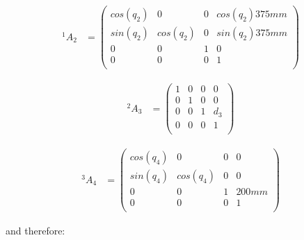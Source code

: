 \begin{align*}
^1A_2 &= 
\begin{pmatrix}
cos(q_2) & 0 & 0 & cos(q_2)375mm \\
sin(q_2) & cos(q_2) & 0 & sin(q_2)375mm \\
0 & 0 & 1 & 0 \\
0 & 0 & 0 & 1 \\
\end{pmatrix}
\end{align*}

\begin{align*}
^2A_3 &= 
\begin{pmatrix}
1 & 0 & 0 & 0 \\
0 & 1 & 0 & 0 \\
0 & 0 & 1 & d_3 \\
0 & 0 & 0 & 1 \\
\end{pmatrix}
\end{align*}

\begin{align*}
^3A_4 &= 
\begin{pmatrix}
cos(q_4) & 0 & 0 & 0 \\
sin(q_4) & cos(q_4) & 0 & 0 \\
0 & 0 & 1 & 200mm \\
0 & 0 & 0 & 1 \\
\end{pmatrix}
\end{align*}

and therefore:

